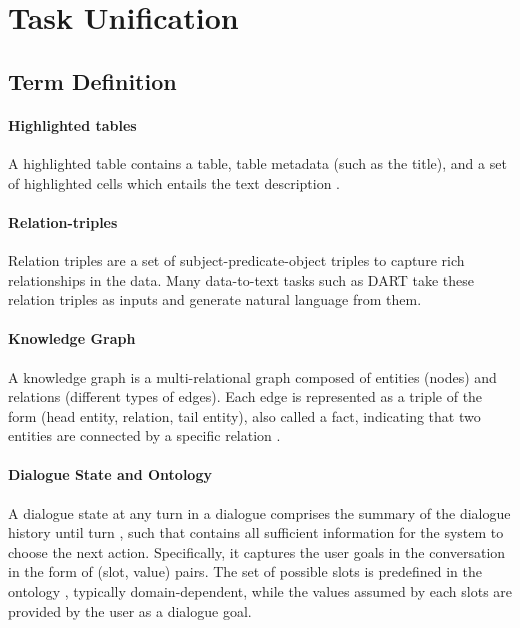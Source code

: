 \documentclass[11pt]{article}
\begin{document}
\section{Task Unification}
\label{app:task-unification}
\subsection{Term Definition}
\label{subapp:term-definition}
\paragraph{Highlighted tables}
A highlighted table contains a table, table metadata (such as the title),
and a set of highlighted cells which entails the text description \cite{parikh2020totto}. 
\paragraph{Relation-triples}
Relation triples are a set of subject-predicate-object triples to capture rich relationships in the data. Many data-to-text tasks such as DART \cite{nan2021dart} take these relation triples as inputs and generate natural language from them.
\paragraph{Knowledge Graph}
A knowledge graph is a multi-relational graph composed of entities (nodes) and relations (different types of edges). Each edge is represented as a triple of the form (head entity, relation, tail entity), also called a fact, indicating that two entities are connected by a specific relation \cite{wang2017survey}.
\paragraph{Dialogue State and Ontology}
A dialogue state  at any turn  in a dialogue comprises the summary of the dialogue history until turn , such that  contains all sufficient information for the system to choose the next action. \cite{williams2016dialog}
Specifically, it captures the user goals in the conversation in the form of (slot, value) pairs. The set of possible slots is predefined in the ontology , typically domain-dependent, while the values assumed by each slots are provided by the user as a dialogue goal. 
\end{document}
